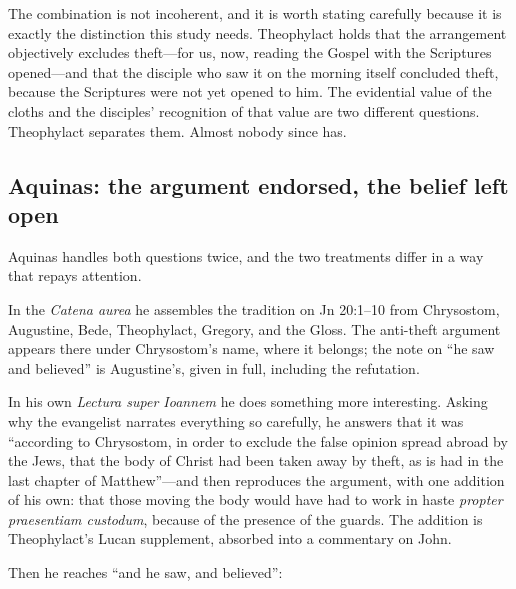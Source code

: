 The combination is not incoherent, and it is worth stating carefully because it
is exactly the distinction this study needs. Theophylact holds that the
arrangement objectively excludes theft---for us, now, reading the Gospel with
the Scriptures opened---and that the disciple who saw it on the morning itself
concluded theft, because the Scriptures were not yet opened to him. The
evidential value of the cloths and the disciples' recognition of that value are
two different questions. Theophylact separates them. Almost nobody since has.

\subsection{Aquinas: the argument endorsed, the belief left open}

Aquinas handles both questions twice, and the two treatments differ in a way
that repays attention.

In the \emph{Catena aurea} he assembles the tradition on Jn 20:1--10 from
Chrysostom, Augustine, Bede, Theophylact, Gregory, and the Gloss. The anti-theft
argument appears there under Chrysostom's name, where it belongs; the note on
``he saw and believed'' is Augustine's, given in full, including the refutation.

In his own \emph{Lectura super Ioannem} he does something more interesting.
Asking why the evangelist narrates everything so carefully, he answers that it
was ``according to Chrysostom, in order to exclude the false opinion spread
abroad by the Jews, that the body of Christ had been taken away by theft, as is
had in the last chapter of Matthew''---and then reproduces the argument, with
one addition of his own: that those moving the body would have had to work in
haste \emph{propter praesentiam custodum}, because of the presence of the
guards. The addition is Theophylact's Lucan supplement, absorbed
into a commentary on John.

Then he reaches ``and he saw, and believed'':

